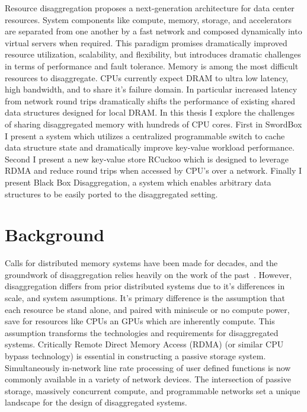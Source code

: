 \documentclass[12pt]{ucsddissertation}
\newcommand{\sword}{SwordBox}
\begin{document}
\begin{dissertationabstract} 
Resource disaggregation proposes a next-generation architecture for data center resources. System
components like compute, memory, storage, and accelerators are separated from one another by a fast
network and composed dynamically into virtual servers when required. This paradigm promises
dramatically improved resource utilization, scalability, and flexibility, but introduces dramatic
challenges in terms of performance and fault tolerance. Memory is among the most difficult resources
to disaggregate. CPUs currently expect DRAM to ultra low latency, high bandwidth, and to share it's
failure domain. In particular increased latency from network round trips dramatically shifts the
performance of existing shared data structures designed for local DRAM.
In this thesis I explore the challenges of sharing disaggregated memory with hundreds of CPU cores.
First in {\sword} I present a system which utilizes a centralized programmable switch to cache data
structure state and dramatically improve key-value workload performance. Second I present a new
key-value store RCuckoo which is designed to leverage RDMA and reduce round trips when accessed by
CPU's over a network. Finally I present Black Box Disaggregation, a system which enables arbitrary
data structures to be easily ported to the disaggregated setting.

\end{dissertationabstract}

\mainmatter

\begin{dissertationintroduction}
\end{dissertationintroduction}

\chapter{Background}

Calls for distributed memory systems have been made for decades, and the groundwork of
disaggregation relies heavily on the work of the past~\cite{treadmarks,gms}. However, disaggregation
differs from prior distributed systems due to it's differences in scale, and system assumptions.
It's primary difference is the assumption that each resource be stand alone, and paired with
miniscule or no compute power, save for resources like CPUs an GPUs which are inherently compute.
This assumption transforms the technologies and requirements for disaggregated systems. Critically
Remote Direct Memory Access (RDMA) (or similar CPU bypass technology) is essential in constructing a
passive storage system. Simultaneously in-network line rate processing of user defined functions is
now commonly available in a variety of network devices. The intersection of passive storage,
massively concurrent compute, and programmable networks set a unique landscape for the design of
disaggregated systems.
\end{document}
